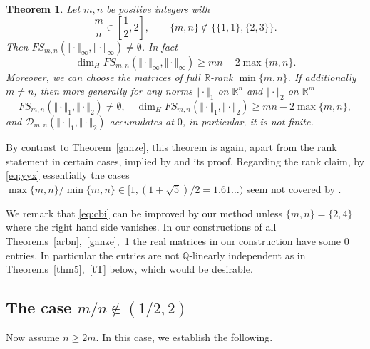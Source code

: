 \documentclass[10pt]{amsart}
\newtheorem{theorem}{Theorem}[section]
\theoremstyle{definition}
\newcommand{\bb}{\boldsymbol{b}}
\newcommand{\R}{\mathbb{R}}
\newcommand{\Z}{\mathbb{Z}}
\newcommand{\Q}{\mathbb{Q}}
\begin{document}
\begin{theorem}  \label{sganz}
    Let $m,n$ be positive integers with
    \[
    \frac{m}{n}\in [\frac{1}{2},2],\qquad \{ m,n\}\notin \{ \{ 1,1\}, \{2,3\}\}.
    \]
    Then $FS_{m,n}(\Vert \cdot \Vert_{\infty}, \Vert \cdot \Vert_{\infty}) \ne \emptyset$. In fact
    \begin{equation}  \label{eq:cbi}
    \dim_H FS_{m,n}(\Vert \cdot \Vert_{\infty}, \Vert \cdot \Vert_{\infty})\ge mn-2\max\{m,n\}.
    \end{equation}
      Moreover, we can choose the matrices
    of full $\R$-rank
    $\min\{ m,n\}$.
    If additionally $m\ne n$,
    then more generally for any norms $\Vert \cdot \Vert_1$ on $\R^n$ and $\Vert \cdot \Vert_2$ on $\R^m$
    \[
    FS_{m,n}(\Vert \cdot \Vert_1, \Vert \cdot \Vert_2) \ne \emptyset, \quad 
    \dim_H FS_{m,n}(\Vert \cdot \Vert_{1}, \Vert \cdot \Vert_{2})\ge mn-2\max\{m,n\},
    \]
    and $\mathcal{D}_{m,n}(\Vert\cdot\Vert_1, \Vert\cdot\Vert_2)$ accumulates at $0$, in particular, it is not finite.
\end{theorem}

By contrast to Theorem~\ref{ganze}, this theorem is again, apart from the rank statement in certain cases, implied by \cite[Theorem~3.15]{Dasetal} and its proof. Regarding the rank claim,  by \eqref{eq:yyx} essentially the cases 
$\max\{ m,n\}/\min\{m,n\}\in [1,(1+\sqrt{5})/2=1.61\ldots)$ 
seem not covered by \cite{Dasetal}. 

We remark that \eqref{eq:cbi} can be improved by our method unless
$\{ m,n\}=\{ 2,4\}$ where the right hand side vanishes.
In our constructions of all 
Theorems~\ref{arbn},~\ref{ganze},~\ref{sganz}
the real matrices in our construction have some $0$ entries. In particular the entries
are not $\Q$-linearly independent
as in Theorems~\ref{thm5},~\ref{tT} below,
which would be desirable.

\subsection{The case $m/n\notin (1/2,2)$ }  \label{se3.2}

Now assume $n\ge 2m$.
In this case, we establish the following.


\end{document}
